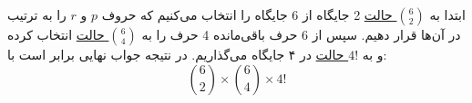 \p
ابتدا به
\underline{${6\choose 2}$ حالت}
 2
جایگاه از 6 جایگاه را انتخاب می‌کنیم که حروف
 $p$ و $r$
را به ترتیب در آن‌ها قرار دهیم. سپس 
از 6 حرف باقی‌مانده 4 حرف را به 
\underline{${6\choose 4}$ حالت}
 انتخاب کرده و به
 \underline{$4!$ حالت}
در ۴ جایگاه می‌گذاریم. در نتیجه جواب نهایی برابر است با:
  $${6 \choose 2}\times {6\choose 4} \times 4!$$